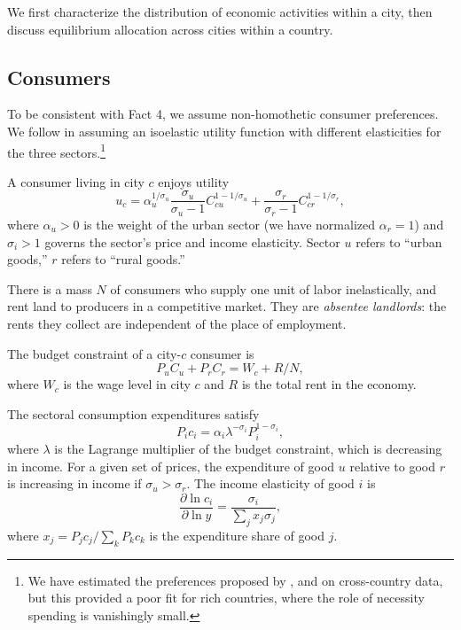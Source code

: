 \documentclass[12pt]{article}
\begin{document}
We first characterize the distribution of economic activities within a city, then discuss equilibrium allocation across cities within a country.

\subsection{Consumers}
To be consistent with Fact 4, we assume non-homothetic consumer preferences. We follow  in assuming an isoelastic utility function with different elasticities for the three sectors.\footnote{We have estimated the preferences proposed by ,  and  on cross-country data, but this provided a poor fit for rich countries, where the role of necessity spending is vanishingly small.}

A consumer living in city $c$ enjoys utility
\begin{equation}
\label{eq:Utility}
u_c = 
\alpha_u^{1/\sigma_u}
	\frac {\sigma_u}
			{\sigma_u-1}
	C_{cu}^{1-1/\sigma_u}
	+
	\frac {\sigma_r}
			{\sigma_r-1}
	C_{cr}^{1-1/\sigma_r},
\end{equation}
where $\alpha_u>0$ is the weight of the urban sector (we have normalized $\alpha_r=1$) and $\sigma_i>1$ governs the sector's price and income elasticity. Sector $u$ refers to ``urban goods,'' $r$ refers to ``rural goods.'' 

There is a mass $N$ of consumers who supply one unit of labor inelastically, and rent land to producers in a competitive market. They are \emph{absentee landlords}: the rents they collect are independent of the place of employment.

The budget constraint of a city-$c$ consumer is
\begin{equation}
\label{eq:BudCons}
P_u C_u + P_r C_r
	= W_c + R/N,
\end{equation}
where $W_c$ is the wage level in city $c$ and $R$ is the total rent in the economy.

The sectoral consumption expenditures satisfy
\begin{equation}\label{eq:ConsShares}
{P_i c_i}
=
\alpha_i
\lambda^{ - \sigma_i}
{ P_i^{1-\sigma_i}},
\end{equation}
where $\lambda$ is the Lagrange multiplier of the budget constraint, which is decreasing in income. For a given set of prices, the expenditure of good $u$ relative to good $r$ is increasing in income if $\sigma_u>\sigma_r$.
The income elasticity of good $i$ is
\begin{equation}\label{eq:income_elasticity}
\frac 	{\partial \ln c_i}
		{\partial \ln y}
=
\frac 	{\sigma_i}
		{\sum_j x_j\sigma_j},
\end{equation}
where $x_j=P_jc_j/\sum_k P_kc_k$ is the expenditure share of good $j$.
\end{document}
